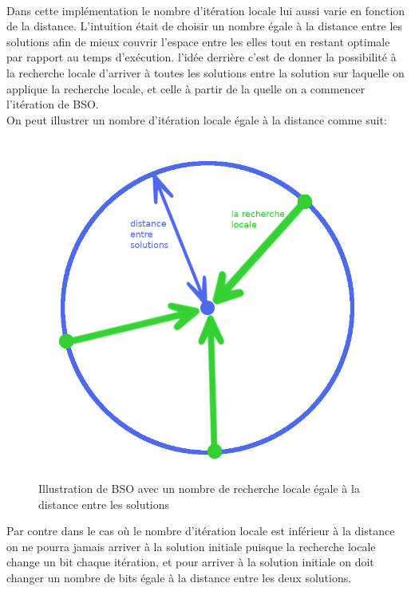 	\paragraph{}
	Dans cette implémentation le nombre d’itération locale lui aussi varie en fonction de la distance. L’intuition était de choisir un nombre égale à la distance entre les solutions afin de mieux couvrir l’espace entre les elles tout en restant optimale par rapport au temps d’exécution. l’idée derrière c’est de donner la possibilité à la recherche locale d’arriver à toutes les solutions entre la solution sur laquelle on applique la recherche locale, et celle à partir de la quelle on a commencer l’itération de BSO.\\
	On peut illustrer un nombre d’itération locale égale à la distance comme suit:
	\begin{figure}[H]\label{localeSearch1}
		\centering
		\includegraphics[scale=0.35]{images/imgs/localeSearch2.png}
		\caption{Illustration de BSO avec un nombre de recherche locale égale à la distance entre les solutions}
	\end{figure}
	Par contre dans le cas où le nombre d’itération locale est inférieur à la distance on ne pourra jamais arriver à la solution initiale puisque la recherche locale change un bit chaque itération, et pour arriver à la solution initiale on doit changer un nombre de bits égale à la distance entre les deux solutions. 

